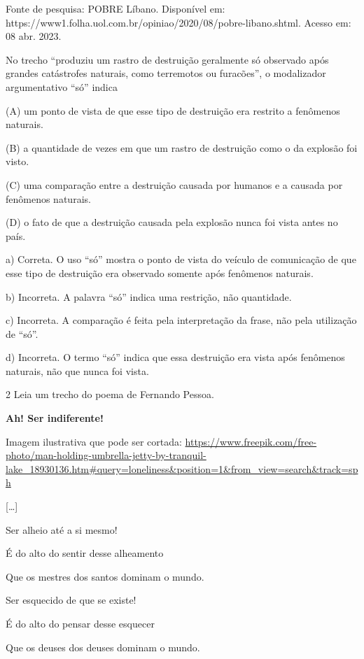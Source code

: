 \begin{itemize}
\begin{itemize}
{\begin{itemize}
\begin{itemize}
Fonte de pesquisa: POBRE Líbano. Disponível em:
https://www1.folha.uol.com.br/opiniao/2020/08/pobre-libano.shtml. Acesso
em: 08 abr. 2023.

No trecho ``produziu um rastro de destruição geralmente só observado
após grandes catástrofes naturais, como terremotos ou furacões'', o
modalizador argumentativo ``só'' indica

(A) um ponto de vista de que esse tipo de destruição era restrito a
fenômenos naturais.

(B) a quantidade de vezes em que um rastro de destruição como o da
explosão foi visto.

(C) uma comparação entre a destruição causada por humanos e a causada
por fenômenos naturais.

(D) o fato de que a destruição causada pela explosão nunca foi vista
antes no país.


a) Correta. O uso ``só'' mostra o ponto de vista do veículo de
comunicação de que esse tipo de destruição era observado somente após
fenômenos naturais.

b) Incorreta. A palavra ``só'' indica uma restrição, não quantidade.

c) Incorreta. A comparação é feita pela interpretação da frase, não pela
utilização de ``só''.

d) Incorreta. O termo ``só'' indica que essa destruição era vista após
fenômenos naturais, não que nunca foi vista.

\num{2} Leia um trecho do poema de Fernando Pessoa.

\textbf{Ah! Ser indiferente!}

Imagem ilustrativa que pode ser cortada:
\url{https://www.freepik.com/free-photo/man-holding-umbrella-jetty-by-tranquil-lake_18930136.htm\#query=loneliness\&position=1\&from_view=search\&track=sph}

{[}\ldots{}{]}

Ser alheio até a si mesmo!

É do alto do sentir desse alheamento

Que os mestres dos santos dominam o mundo.

Ser esquecido de que se existe!

É do alto do pensar desse esquecer

Que os deuses dos deuses dominam o mundo.


\end{itemize}
\end{itemize}}
\end{itemize}
\end{itemize}
